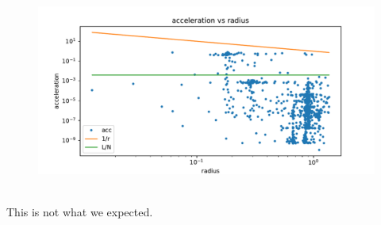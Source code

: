         \newpage
        \begin{figure}[h!]
            \centering
            \includegraphics[width=\textwidth]{../figures/acc2.pdf}
        \end{figure} \ \\ 
        This is not what we expected.
